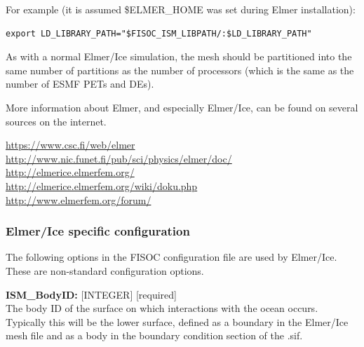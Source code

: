 \documentclass[11pt]{article}
\begin{document}
For example (it is assumed \$ELMER\_HOME was set during Elmer installation):
\begin{lstlisting}
export LD_LIBRARY_PATH="$FISOC_ISM_LIBPATH/:$LD_LIBRARY_PATH"
\end{lstlisting}

As with a normal Elmer/Ice simulation, the mesh should be partitioned into the 
same number of partitions as the number of processors (which is the same as the number of 
ESMF PETs and DEs). 

More information about Elmer, and especially Elmer/Ice, can be found on several sources 
on the internet.

\begin{flushleft}
\url{https://www.csc.fi/web/elmer}\\
\url{http://www.nic.funet.fi/pub/sci/physics/elmer/doc/}\\
\url{http://elmerice.elmerfem.org/}\\
\url{http://elmerice.elmerfem.org/wiki/doku.php}\\
\url{http://www.elmerfem.org/forum/}\\
\end{flushleft}



\subsubsection{Elmer/Ice specific configuration}

The following options in the FISOC configuration file are used by Elmer/Ice.  These 
are non-standard configuration options.

\begin{flushleft}
\textbf{ISM\_BodyID:} [INTEGER] [required]                               \\
The body ID of the surface on which interactions with the ocean occurs.  
Typically this will be the lower surface, defined as a boundary in the   
Elmer/Ice mesh file and as a body in the boundary condition section of   
the .sif.                                                                \\
\vspace{6pt}
\end{flushleft}
\end{document}
